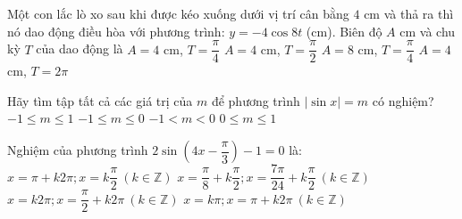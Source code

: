 \begin{ex}
	Một con lắc lò xo sau khi được kéo xuống dưới vị trí cân bằng $4$ cm và thả ra thì nó dao động điều hòa với phương trình: $y=-4\cos 8t$ (cm). Biên độ $A$ cm và chu kỳ $T$ của dao động là
	\choice
	{\True $A=4$ cm, $T=\dfrac{\pi }{4}$}
	{$A=4$ cm, $T=\dfrac{\pi }{2}$}
	{$A=8$ cm, $T=\dfrac{\pi }{4}$}
	{$A=4$ cm, $T=2\pi $}
\end{ex}
\begin{ex}
	Hãy tìm tập tất cả các giá trị của $m$ để phương trình $\left| \sin x \right|=m$ có nghiệm?
	\choice
	{$-1\le m\le 1$}
	{$-1\le m\le 0$}
	{$-1<m<0$}
	{\True $0\le m\le 1$}
\end{ex}
\begin{ex}
	Nghiệm của phương trình $2\sin \left(4x-\dfrac{\pi }{3}\right)-1=0$ là:
	\choice
	{$x=\pi +k2\pi ;x=k\dfrac{\pi }{2}\ (k \in \mathbb{Z})$}
	{$x=\dfrac{\pi }{8}+k\dfrac{\pi }{2};x=\dfrac{7\pi }{24}+k\dfrac{\pi }{2}\ (k \in \mathbb{Z})$}
	{$x=k2\pi ;x=\dfrac{\pi }{2}+k2\pi\ (k \in \mathbb{Z})$}
	{$x=k\pi ;x=\pi +k2\pi\ (k \in \mathbb{Z})$}
\end{ex}
